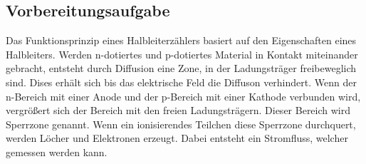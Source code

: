 \subsection{Vorbereitungsaufgabe}
\label{sec:Vorbereitungsaufgabe}

Das Funktionsprinzip eines Halbleiterzählers basiert auf den Eigenschaften eines Halbleiters.
Werden n-dotiertes und p-dotiertes Material in Kontakt miteinander gebracht, entsteht durch Diffusion eine Zone, in 
der Ladungsträger freibeweglich sind. Dises erhält sich bis das elektrische Feld die Diffuson verhindert.
Wenn der n-Bereich mit einer Anode und der p-Bereich mit einer Kathode verbunden wird, vergrößert sich der Bereich
mit den freien Ladungsträgern. Dieser Bereich wird Sperrzone genannt.
Wenn ein ionisierendes Teilchen diese Sperrzone durchquert, werden Löcher und Elektronen erzeugt. Dabei entsteht
ein Stromfluss, welcher gemessen werden kann.
